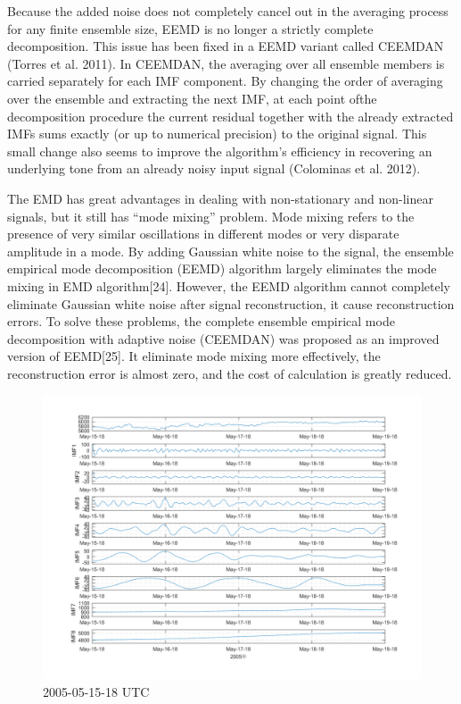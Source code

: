 \documentclass[draft]{agujournal2019}
\begin{document}
Because the added noise does not completely cancel out in the averaging process
for any finite ensemble size, EEMD is no longer a strictly complete decomposition. This issue has been fixed in a EEMD variant called CEEMDAN (Torres et al. 2011). In CEEMDAN, the averaging over all ensemble members is carried separately for each IMF component. By changing the order of averaging over the ensemble and extracting the next IMF, at each point ofthe decomposition procedure the current residual together with the already extracted IMFs sums exactly (or up to numerical precision) to the original signal. This small change also seems to improve the algorithm’s efficiency in recovering an underlying tone from an already noisy input signal (Colominas et al. 2012).

The EMD has great advantages in dealing with non-stationary and non-linear signals, but it still
has “mode mixing” problem. Mode mixing refers to the presence of very similar oscillations in different modes or very disparate amplitude in a mode. By adding Gaussian white noise to the signal, the ensemble empirical mode decomposition (EEMD) algorithm largely eliminates the mode mixing in EMD algorithm[24]. However, the EEMD algorithm cannot completely eliminate Gaussian white noise after signal reconstruction, it cause reconstruction errors. To solve these problems, the complete ensemble empirical mode decomposition with adaptive noise (CEEMDAN) was proposed as an improved version of EEMD[25]. It eliminate mode mixing more effectively, the reconstruction error is almost zero, and the cost of calculation is greatly reduced.

\begin{figure}[h]
      \centering
      \includegraphics[width=350pt]{img//ceemdan1.png}
      \caption{2005-05-15-18 UTC}\label{fig:5}
      \end{figure}
\end{document}
